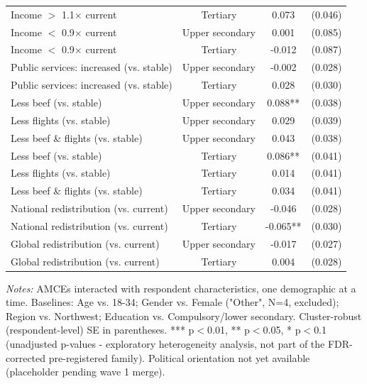 \begin{table}[H]
\begin{tabular}{ l c c c }
\hspace{0.05cm} Income $>$ 1.1$\times$ current & Tertiary & 0.073 & (0.046) \\
\hspace{0.05cm} Income $<$ 0.9$\times$ current & Upper secondary & 0.001 & (0.085) \\
\hspace{0.05cm} Income $<$ 0.9$\times$ current & Tertiary & -0.012 & (0.087) \\
\hspace{0.05cm} Public services: increased (vs. stable) & Upper secondary & -0.002 & (0.028) \\
\hspace{0.05cm} Public services: increased (vs. stable) & Tertiary & 0.028 & (0.030) \\
\hspace{0.05cm} Less beef (vs. stable) & Upper secondary & 0.088** & (0.038) \\
\hspace{0.05cm} Less flights (vs. stable) & Upper secondary & 0.029 & (0.039) \\
\hspace{0.05cm} Less beef \& flights (vs. stable) & Upper secondary & 0.043 & (0.038) \\
\hspace{0.05cm} Less beef (vs. stable) & Tertiary & 0.086** & (0.041) \\
\hspace{0.05cm} Less flights (vs. stable) & Tertiary & 0.014 & (0.041) \\
\hspace{0.05cm} Less beef \& flights (vs. stable) & Tertiary & 0.034 & (0.041) \\
\hspace{0.05cm} National redistribution (vs. current) & Upper secondary & -0.046 & (0.028) \\
\hspace{0.05cm} National redistribution (vs. current) & Tertiary & -0.065** & (0.030) \\
\hspace{0.05cm} Global redistribution (vs. current) & Upper secondary & -0.017 & (0.027) \\
\hspace{0.05cm} Global redistribution (vs. current) & Tertiary & 0.004 & (0.028) \\
\hline \hline
\end{tabular}
\begin{tablenotes}
\small
\item \textit{Notes:} AMCEs interacted with respondent characteristics, one demographic at a time. Baselines: Age vs. 18-34; Gender vs. Female ("Other", N=4, excluded); Region vs. Northwest; Education vs. Compulsory/lower secondary. Cluster-robust (respondent-level) SE in parentheses. *** p$<$0.01, ** p$<$0.05, * p$<$0.1 (unadjusted p-values - exploratory heterogeneity analysis, not part of the FDR-corrected pre-registered family). Political orientation not yet available (placeholder pending wave 1 merge).
\end{tablenotes}
    \label{tab:table10}
\end{table}
